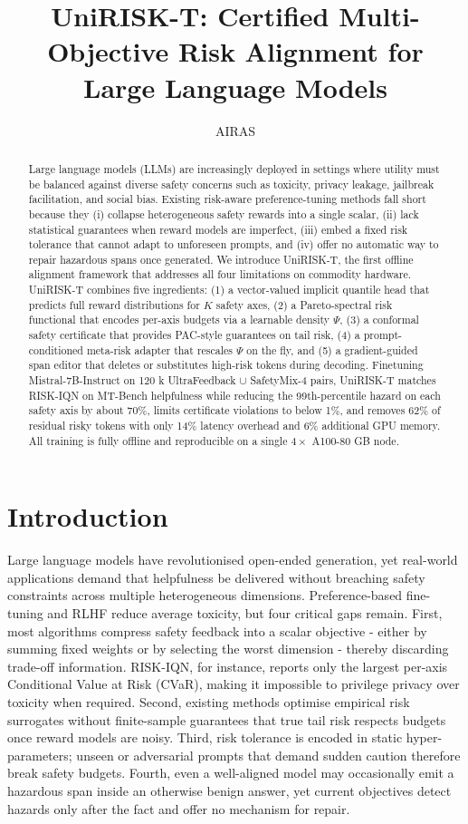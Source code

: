 \documentclass{article}
\title{UniRISK-T: Certified Multi-Objective Risk Alignment for Large Language Models}
\author{AIRAS}
\begin{document}
\maketitle

\begin{abstract}
Large language models (LLMs) are increasingly deployed in settings where utility must be balanced against diverse safety concerns such as toxicity, privacy leakage, jailbreak facilitation, and social bias. Existing risk-aware preference-tuning methods fall short because they (i) collapse heterogeneous safety rewards into a single scalar, (ii) lack statistical guarantees when reward models are imperfect, (iii) embed a fixed risk tolerance that cannot adapt to unforeseen prompts, and (iv) offer no automatic way to repair hazardous spans once generated. We introduce UniRISK-T, the first offline alignment framework that addresses all four limitations on commodity hardware. UniRISK-T combines five ingredients: (1) a vector-valued implicit quantile head that predicts full reward distributions for $K$ safety axes, (2) a Pareto-spectral risk functional that encodes per-axis budgets via a learnable density $\Psi$, (3) a conformal safety certificate that provides PAC-style guarantees on tail risk, (4) a prompt-conditioned meta-risk adapter that rescales $\Psi$ on the fly, and (5) a gradient-guided span editor that deletes or substitutes high-risk tokens during decoding. Finetuning Mistral-7B-Instruct on 120 k UltraFeedback $\cup$ SafetyMix-4 pairs, UniRISK-T matches RISK-IQN on MT-Bench helpfulness while reducing the 99th-percentile hazard on each safety axis by about 70\%, limits certificate violations to below 1\%, and removes 62\% of residual risky tokens with only 14\% latency overhead and 6\% additional GPU memory. All training is fully offline and reproducible on a single $4 \times$ A100-80 GB node.
\end{abstract}

\section{Introduction}
Large language models have revolutionised open-ended generation, yet real-world applications demand that helpfulness be delivered without breaching safety constraints across multiple heterogeneous dimensions. Preference-based fine-tuning and RLHF reduce average toxicity, but four critical gaps remain. First, most algorithms compress safety feedback into a scalar objective - either by summing fixed weights or by selecting the worst dimension - thereby discarding trade-off information. RISK-IQN, for instance, reports only the largest per-axis Conditional Value at Risk (CVaR), making it impossible to privilege privacy over toxicity when required. Second, existing methods optimise empirical risk surrogates without finite-sample guarantees that true tail risk respects budgets once reward models are noisy. Third, risk tolerance is encoded in static hyper-parameters; unseen or adversarial prompts that demand sudden caution therefore break safety budgets. Fourth, even a well-aligned model may occasionally emit a hazardous span inside an otherwise benign answer, yet current objectives detect hazards only after the fact and offer no mechanism for repair.
\end{document}
